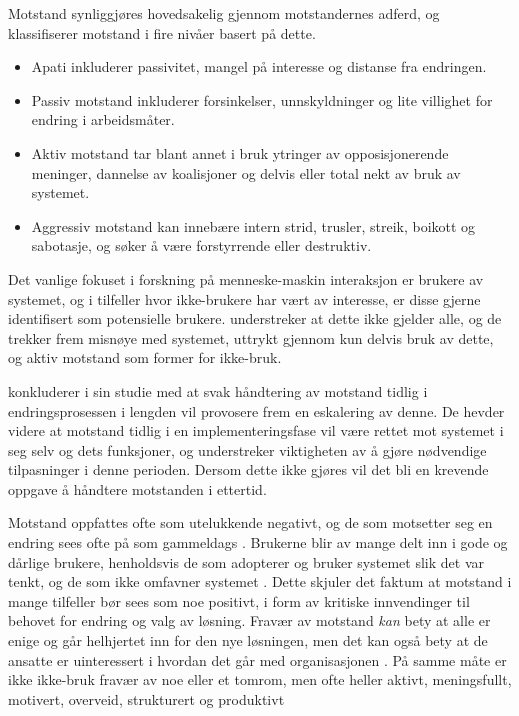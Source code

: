 \noindent
Motstand synliggjøres hovedsakelig gjennom motstandernes adferd, og \citet{Lapointe05} klassifiserer motstand i fire nivåer basert på dette.
 
\begin{itemize}
\item Apati inkluderer passivitet, mangel på interesse og distanse fra endringen.
\item Passiv motstand inkluderer forsinkelser, unnskyldninger og lite villighet for endring i arbeidsmåter.
\item Aktiv motstand tar blant annet i bruk ytringer av opposisjonerende meninger, dannelse av koalisjoner og delvis eller total nekt av bruk av systemet.
\item Aggressiv motstand kan innebære intern strid, trusler, streik, boikott og sabotasje, og søker å være forstyrrende eller destruktiv.
\end{itemize}
 
\noindent
Det vanlige fokuset i forskning på menneske-maskin interaksjon er brukere av systemet, og i tilfeller hvor ikke-brukere har vært av interesse, er disse gjerne identifisert som potensielle brukere. \citet{Satchell09} understreker at dette ikke gjelder alle, og de trekker frem misnøye med systemet, uttrykt gjennom kun delvis bruk av dette, og aktiv motstand som former for ikke-bruk.
 
\noindent
\citet{Lapointe05} konkluderer i sin studie med at svak håndtering av motstand tidlig i endringsprosessen i lengden vil provosere frem en eskalering av denne. De hevder videre at motstand tidlig i en implementeringsfase vil være rettet mot systemet i seg selv og dets funksjoner, og understreker viktigheten av å gjøre nødvendige tilpasninger i denne perioden. Dersom dette ikke gjøres vil det bli en krevende oppgave å håndtere motstanden i ettertid.
 
\noindent
Motstand oppfattes ofte som utelukkende negativt, og de som motsetter seg en endring sees ofte på som gammeldags \citep{Jacobsen12}. Brukerne blir av mange delt inn i gode og  dårlige brukere, henholdsvis de som adopterer og bruker systemet slik det var tenkt, og de som ikke omfavner systemet \citep{Satchell09}. Dette skjuler det faktum at motstand i mange tilfeller bør sees som noe positivt, i form av kritiske innvendinger til behovet for endring og valg av løsning. Fravær av motstand \textit{kan} bety at alle er enige og går helhjertet inn for den nye løsningen, men det kan også bety at de ansatte er uinteressert i hvordan det går med organisasjonen \citep{Jacobsen12}. På samme måte er ikke ikke-bruk fravær av noe eller et tomrom, men ofte heller aktivt, meningsfullt, motivert, overveid, strukturert og produktivt \citep{Satchell09}
 
